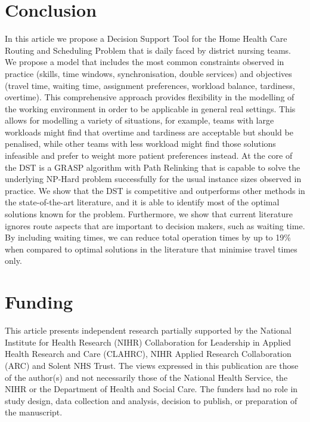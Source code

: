 \documentclass[a4paper,11pt]{elsarticle}
\begin{document}
\section{Conclusion}\label{seq:Conclusion}

In this article we propose a Decision Support Tool for the Home Health Care Routing and Scheduling Problem that is daily faced by district nursing teams. We propose a model that includes the most common constraints observed in practice (skills, time windows, synchronisation, double services) and objectives (travel time, waiting time, assignment preferences, workload balance, tardiness, overtime). This comprehensive approach provides flexibility in the modelling of the working environment in order to be applicable in general real settings. This allows for modelling a variety of situations, for example, teams with large workloads might find that overtime and tardiness are acceptable but should be penalised, while other teams with less workload might find those solutions infeasible and prefer to weight more patient preferences instead.
At the core of the DST is a GRASP algorithm with Path Relinking that is capable to solve the underlying NP-Hard problem successfully for the usual instance sizes observed in practice. We show that the DST is competitive and outperforms other methods in the state-of-the-art literature, and it is able to identify most of the optimal solutions known for the problem. 
Furthermore, we show that current literature ignores route aspects that are important to decision makers, such as waiting time. By including waiting times, we can reduce total operation times by up to 19\% when compared to optimal solutions in the literature that minimise travel times only.

\section{Funding}

This article presents independent research partially supported by the National Institute for Health Research (NIHR) Collaboration for Leadership in Applied Health Research and Care (CLAHRC), NIHR Applied Research Collaboration (ARC) and Solent NHS Trust. The views expressed in this publication are those of the author(s) and not necessarily those of the National Health Service, the NIHR or the Department of Health and Social Care. The funders had no role in study design, data collection and analysis, decision to publish, or preparation of the manuscript.
\end{document}
